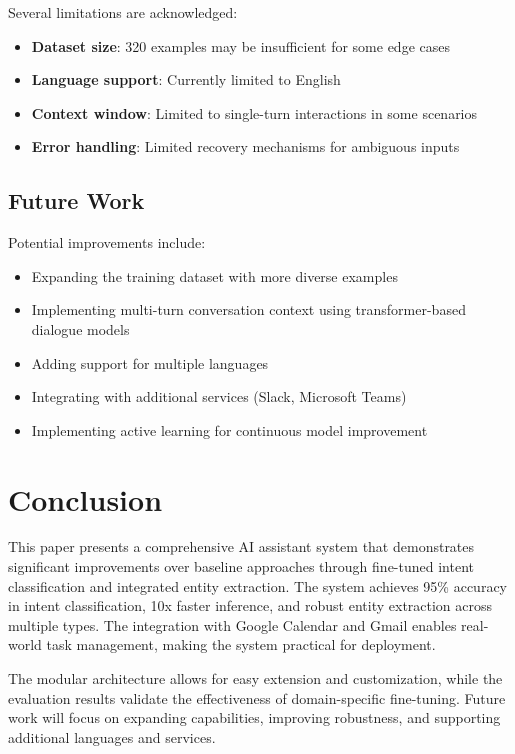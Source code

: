 \documentclass[conference]{IEEEtran}
\begin{document}
Several limitations are acknowledged:
\begin{itemize}
    \item \textbf{Dataset size}: 320 examples may be insufficient for some edge cases
    \item \textbf{Language support}: Currently limited to English
    \item \textbf{Context window}: Limited to single-turn interactions in some scenarios
    \item \textbf{Error handling}: Limited recovery mechanisms for ambiguous inputs
\end{itemize}

\subsection{Future Work}

Potential improvements include:
\begin{itemize}
    \item Expanding the training dataset with more diverse examples
    \item Implementing multi-turn conversation context using transformer-based dialogue models
    \item Adding support for multiple languages
    \item Integrating with additional services (Slack, Microsoft Teams)
    \item Implementing active learning for continuous model improvement
\end{itemize}

\section{Conclusion}

This paper presents a comprehensive AI assistant system that demonstrates significant improvements over baseline approaches through fine-tuned intent classification and integrated entity extraction. The system achieves 95\% accuracy in intent classification, 10x faster inference, and robust entity extraction across multiple types. The integration with Google Calendar and Gmail enables real-world task management, making the system practical for deployment.

The modular architecture allows for easy extension and customization, while the evaluation results validate the effectiveness of domain-specific fine-tuning. Future work will focus on expanding capabilities, improving robustness, and supporting additional languages and services.
\end{document}
